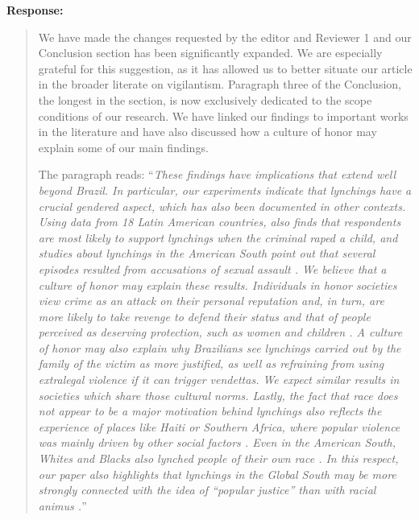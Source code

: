 \documentclass[a4paper,12pt]{article}
\begin{document}
\noindent \textbf{Response:} 
\begin{quote}

We have made the changes requested by the editor and Reviewer 1 and our
Conclusion section has been significantly expanded. We are especially grateful
for this suggestion, as it has allowed us to better situate our article in the
broader literate on vigilantism. Paragraph three of the Conclusion, the longest
in the section, is now exclusively dedicated to the scope conditions of our
research. We have linked our findings to important works in the literature and
have also discussed how a culture of honor may explain some of our main
findings. 

The paragraph reads: ``\textit{These findings have implications that extend
well beyond Brazil. In particular, our experiments indicate that lynchings
have a crucial gendered aspect, which has also been documented in other
contexts. Using data from 18 Latin American countries,
\citet{nivette2016institutional} also finds that respondents are most likely
to support lynchings when the criminal raped a child, and studies about
lynchings in the American South point out that several episodes resulted from
accusations of sexual assault \citep{jacquet2013giles, smaangs2020race}. We
believe that a culture of honor may explain these results. Individuals in
honor societies view crime as an attack on their personal reputation and, in
turn, are more likely to take revenge to defend their status and that of
people perceived as deserving protection, such as women and children
\citep{nisbett2018culture}. A culture of honor may also explain why
Brazilians see lynchings carried out by the family of the victim as more
justified, as well as refraining from using extralegal violence if it can
trigger vendettas. We expect similar results in societies which share those
cultural norms. Lastly, the fact that race does not appear to be a major
motivation behind lynchings also reflects the experience of places like Haiti
or Southern Africa, where popular violence was mainly driven by other social
factors \citep{berg2011globalizing, jung2020lynching}. Even in the American
South, Whites and Blacks also lynched people of their own race
\citep{beck1997race}. In this respect, our paper also highlights that
lynchings in the Global South may be more strongly connected with the idea of
``popular justice'' than with racial animus \citep{martins2015linchamentos}.}''

\end{quote}
\end{document}
